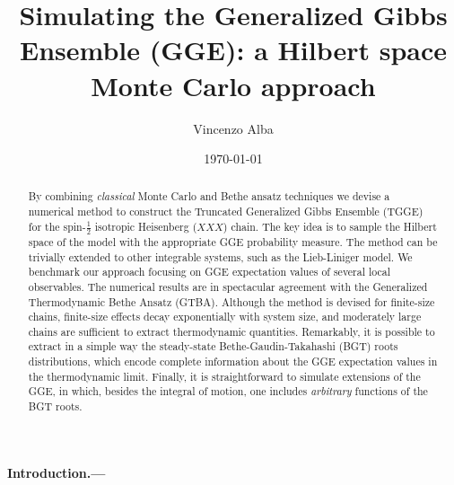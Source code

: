 \documentclass[twocolumn,superscriptaddress,prb,10pt]{revtex4-1}
\begin{document}
\title{Simulating the Generalized Gibbs Ensemble (GGE): a Hilbert space 
Monte Carlo approach} 

\author{Vincenzo Alba}

\date{\today}




\begin{abstract} 

By combining {\it classical} Monte Carlo and Bethe ansatz techniques we devise a numerical 
method to construct the Truncated Generalized Gibbs Ensemble (TGGE) for the spin-$\frac{1}{2}$ 
isotropic Heisenberg ($XXX$) chain. The key idea is to sample the Hilbert space of the model 
with the appropriate GGE probability measure. The method can be trivially extended to other 
integrable systems, such as the Lieb-Liniger model. We benchmark our approach focusing on 
GGE expectation values of several local observables. The numerical results are in spectacular 
agreement with the Generalized Thermodynamic Bethe Ansatz (GTBA). Although the method is devised 
for finite-size chains, finite-size effects decay exponentially with system size, and moderately 
large chains are sufficient to extract thermodynamic quantities. Remarkably, it is possible 
to extract in a simple way the steady-state Bethe-Gaudin-Takahashi (BGT) roots distributions, 
which encode complete information about the GGE expectation values in the thermodynamic limit. 
Finally, it is straightforward to simulate extensions of the GGE, in which, besides the integral 
of motion, one includes {\it arbitrary} functions of the BGT roots. 


\end{abstract}


\maketitle


\paragraph*{Introduction.---}
\end{document}
